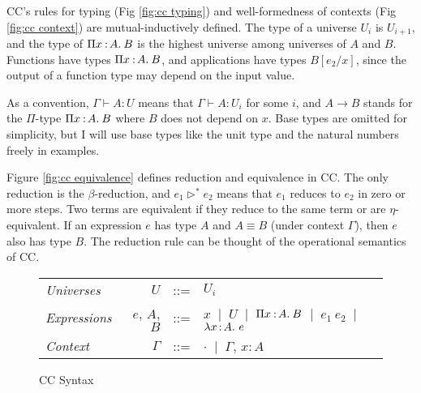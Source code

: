 CC's rules for typing (Fig \ref{fig:cc typing}) and well-formedness of contexts (Fig \ref{fig:cc context}) are mutual-inductively defined. The type of a universe $U_i$ is $U_{i+1}$, and the type of $\Pi x\mkern1.5mu{\hspace{0.5mm}{:}\hspace{0.5mm}} A.\hspace{0.8mm}B$ is the highest universe among universes of $A$ and $B$. Functions have types $\Pi x\mkern1.5mu{\hspace{0.5mm}{:}\hspace{0.5mm}} A.\hspace{0.8mm}B$, and applications have types $B[e_2\slash x]$, since the output of a function type may depend on the input value.  

As a convention, $\Gamma \vdash A : U$ means that $\Gamma \vdash A : U_i$ for some $i$, and $A \rightarrow B$ stands for the $\Pi$-type $\Pi x\mkern1.5mu{\hspace{0.5mm}{:}\hspace{0.5mm}} A.\hspace{0.8mm}B$ where $B$ does not depend on $x$. Base types are omitted for simplicity, but I will use base types like the unit type and the natural numbers freely in examples.

Figure \ref{fig:cc equivalence} defines reduction and equivalence in CC. The only reduction is the $\beta$-reduction, and $e_1 \triangleright^* e_2$ means that $e_1$ reduces to $e_2$ in zero or more steps. Two terms are equivalent if they reduce to the same term or are $\eta$-equivalent. If an expression $e$ has type $A$ and $A \equiv B$ (under context $\Gamma$), then $e$ also has type $B$. The reduction rule can be thought of the operational semantics of CC.

\begin{figure}

	\renewcommand{\arraystretch}{1.3}
	\begin{tabular}{l r l l}
		\textit{Universes}   & $U$       & ::= & ${U_i}$ \\
		\textit{Expressions} & ${e}$, ${A}$, ${B}$  & ::= & 
			${x}$ $\ |\ $ ${U}$ $\ |\ $ $\Pi x\mkern1.5mu{\hspace{0.5mm}{:}\hspace{0.5mm}} A.\hspace{0.8mm}B$ $\ |\ $ ${e_1}\ {e_2}$ $\ |\ $ $\lambda x\hspace{0.5mm}{:}\hspace{0.5mm} A.\ e$\\
		\textit{Context} & ${\Gamma}$ & ::= & ${\cdot}$ $\ |\ $ ${\Gamma}$, ${x} : {A}$ \\
	\end{tabular}
	\caption{CC Syntax}
	\label{fig:cc syntax}	
\end{figure}

